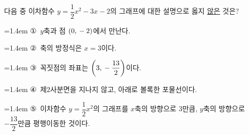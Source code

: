 다음 중 이차함수 $y=\dfrac{1}{2}x^2-3x-2$의 그래프에 대한 설명으로 옳지 \underline{않은} 것은?
\par\medskip\par\noindent\hangindent=1.4em {\small ①}\ $y$축과 점 $(0{,}\mkern3mu -2)$에서 만난다.\par\noindent\hangindent=1.4em {\small ②}\ 축의 방정식은 $x=3$이다.\par\noindent\hangindent=1.4em {\small ③}\ 꼭짓점의 좌표는 $\left(3{,}\mkern3mu -\dfrac{13}{2}\right)$이다.\par\noindent\hangindent=1.4em {\small ④}\ 제$2$사분면을 지나지 않고, 아래로 볼록한 포물선이다.\par\noindent\hangindent=1.4em {\small ⑤}\ 이차함수 $y=\dfrac{1}{2}x^2$의 그래프를 $x$축의 방향으로 $3$만큼, $y$축의 방향으로 $-\dfrac{13}{2}$만큼 평행이동한 것이다.\par\medskip
